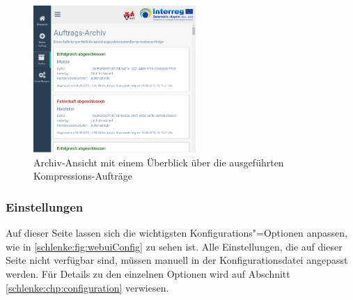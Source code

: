 \begin{figure}
\begin{center}
\includegraphics[width=0.55\textwidth]{Figures/schlenker/webui/archive.png}
\caption{Archiv-Ansicht mit einem Überblick über die ausgeführten Kompressions-Aufträge}
\label{schlenke:fig:webuiArchive}
\end{center}
\end{figure}

\subsubsection{Einstellungen}

Auf dieser Seite lassen sich die wichtigsten Konfigurations"=Optionen anpassen, wie in \autoref{schlenke:fig:webuiConfig} zu sehen ist. Alle Einstellungen, die auf dieser Seite nicht verfügbar sind, müssen manuell in der Konfigurationsdatei angepasst werden. Für Details zu den einzelnen Optionen wird auf Abschnitt \ref{schlenke:chp:configuration} verwiesen.

